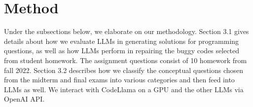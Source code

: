 \section{Method}








Under the subsections below, we elaborate on our methodology. Section 3.1 gives details about how we evaluate LLMs in generating solutions for programming questions, as well as how LLMs perform in repairing the buggy codes selected from student homework. The assignment questions consist of 10 homework from fall 2022. Section 3.2 describes how we classify the conceptual questions chosen from the midterm and final exams into various categories and then feed into LLMs as well. We interact with CodeLlama on a GPU and the other LLMs via OpenAI API.

